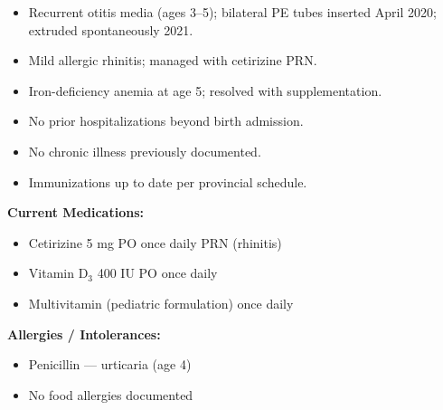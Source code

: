 \documentclass[11pt,a4paper]{article}
\begin{document}
\begin{minipage}[t]{0.48\linewidth}
\begin{tcolorbox}[pedteal,
  title={\faNotesMedical\enspace Past Medical History},
  height=62mm]
  \begin{itemize}[leftmargin=1.2em, itemsep=3pt, topsep=0pt, label={\color{PedTeal}\textbullet}]
    \item Recurrent otitis media (ages 3--5); bilateral PE tubes
          inserted April 2020; extruded spontaneously 2021.
    \item Mild allergic rhinitis; managed with cetirizine PRN.
    \item Iron-deficiency anemia at age 5; resolved with supplementation.
    \item No prior hospitalizations beyond birth admission.
    \item No chronic illness previously documented.
    \item Immunizations up to date per provincial schedule.
  \end{itemize}
\end{tcolorbox}
\end{minipage}\par
%
\begin{minipage}[t]{0.48\linewidth}
\hfill
\begin{tcolorbox}[pedteal,
  title={\faPills\enspace Medications \& Allergies},
  height=62mm]
  \textbf{\color{PedTeal}Current Medications:}
  \begin{itemize}[leftmargin=1.2em, itemsep=2pt, topsep=2pt, label={\color{PedTeal}\textbullet}]
    \item Cetirizine 5 mg PO once daily PRN (rhinitis)
    \item Vitamin D$_3$ 400 IU PO once daily
    \item Multivitamin (pediatric formulation) once daily
  \end{itemize}
  \medskip
  \textbf{\color{PedTeal}Allergies / Intolerances:}
  \begin{itemize}[leftmargin=1.2em, itemsep=2pt, topsep=2pt, label={\color{WarnBorder}\faExclamationTriangle}]
    \item Penicillin --- urticaria (age 4)
    \item No food allergies documented
  \end{itemize}
\end{tcolorbox}
\end{minipage}
\end{document}
